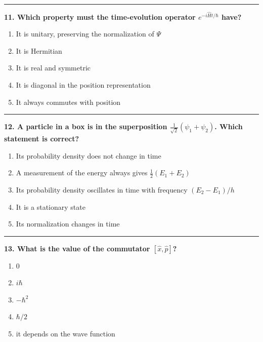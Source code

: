 \documentclass[
  english,
  9pt,
]{extbook}
\providecommand{\tightlist}{%
  \setlength{\itemsep}{0pt}\setlength{\parskip}{0pt}}
\theoremstyle{definition}
\theoremstyle{definition}
\theoremstyle{definition}
\theoremstyle{definition}
\theoremstyle{remark}
\begin{document}
\begin{center}\rule{0.5\linewidth}{0.5pt}\end{center}

\textbf{11. Which property must the time‑evolution operator \(e^{-i\hat{H}t/\hbar}\) have?}

\begin{enumerate}
\def\labelenumi{\alph{enumi}.}
\tightlist
\item
  It is unitary, preserving the normalization of \(\Psi\)\\
\item
  It is Hermitian\\
\item
  It is real and symmetric\\
\item
  It is diagonal in the position representation\\
\item
  It always commutes with position
\end{enumerate}

\begin{center}\rule{0.5\linewidth}{0.5pt}\end{center}

\textbf{12. A particle in a box is in the superposition \(\frac{1}{\sqrt{2}}(\psi_1+\psi_2)\). Which statement is correct?}

\begin{enumerate}
\def\labelenumi{\alph{enumi}.}
\tightlist
\item
  Its probability density does not change in time\\
\item
  A measurement of the energy always gives \(\frac{1}{2}(E_1+E_2)\)\\
\item
  Its probability density oscillates in time with frequency \((E_2-E_1)/h\)\\
\item
  It is a stationary state\\
\item
  Its normalization changes in time
\end{enumerate}

\begin{center}\rule{0.5\linewidth}{0.5pt}\end{center}

\textbf{13. What is the value of the commutator \([\hat{x},\hat{p}]\)?}

\begin{enumerate}
\def\labelenumi{\alph{enumi}.}
\tightlist
\item
  \(0\)\\
\item
  \(i\hbar\)\\
\item
  \(-\hbar^2\)\\
\item
  \(\hbar/2\)\\
\item
  it depends on the wave function
\end{enumerate}
\end{document}
